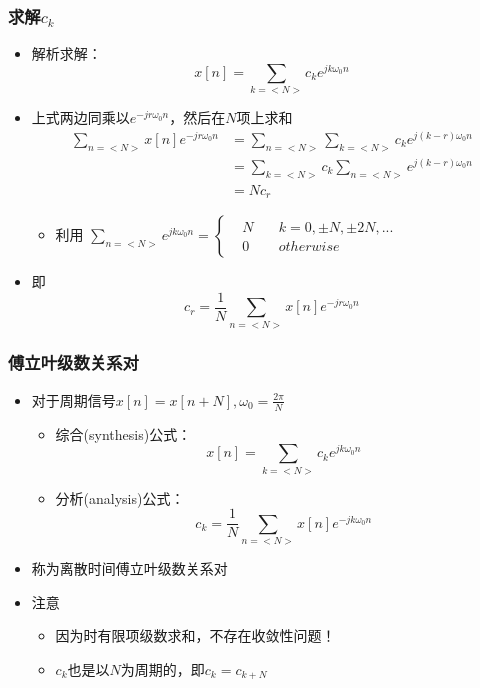 \documentclass[CJKutf8,xcolor=pdftex,dvipsnames,table]{beamer}
\begin{document}
\begin{CJK*}{UTF8}{song}
\begin{frame}
\begin{itemize}
    \end{itemize}
  \end{frame}  
  
  \begin{frame}
    \frametitle{求解$c_k$}
    \begin{itemize}
    \item 解析求解：\[ x[n] = \sum_{k=<N>} c_k e^{jk\omega_0 n} \]
    \item 上式两边同乘以$e^{-jr\omega_0 n}$，然后在$N$项上求和
    	\begin{align*}
 		\sum_{n=<N>}x[n]e^{-jr\omega_0 n} & = \sum_{n=<N>}\sum_{k=<N>} c_k e^{j(k-r)\omega_0 n} \\
		& = \sum_{k=<N>}c_k\sum_{n=<N>} e^{j(k-r)\omega_0 n}     \\
		& = Nc_r
    	\end{align*}
		\begin{itemize}
		\item 利用
		    \begin{math}
\sum_{n=<N>} e^{jk\omega_0 n} = 
\left\{
    \begin {aligned}
         & N \quad & k = 0, \pm N, \pm 2N, ... \\
         & 0 \quad & otherwise                  
    \end{aligned}
\right.
	\end{math}   

		\end{itemize}
	\item 即 \[ c_r = \frac{1}{N} \sum_{n=<N>}x[n]e^{-jr\omega_0 n}  \]
    \end{itemize}
  \end{frame}           
    
  
  \begin{frame}
    \frametitle{傅立叶级数关系对}
    \begin{itemize}   
    	\item 对于周期信号$x[n]=x[n+N], \omega_0=\frac{2\pi}{N}$     

	    \begin{itemize}
    		\item 综合(synthesis)公式：\[ x[n] = \sum_{k=<N>} c_k e^{jk\omega_0 n} \]
			\item 分析(analysis)公式：\[ c_k = \frac{1}{N} \sum_{n=<N>}x[n]e^{-jk\omega_0 n}  \]
    	\end{itemize}   
	    \item 称为{\color{red}离散时间傅立叶级数关系对}
	    \item 注意
	    	\begin{itemize}
	    	\item 因为时有限项级数求和，不存在收敛性问题！
			\item $c_k$也是以$N$为周期的，即$c_k = c_{k+N}$
	    	\end{itemize}
    \end{itemize}   
  \end{frame}    
    

\end{CJK*}
\end{document}
